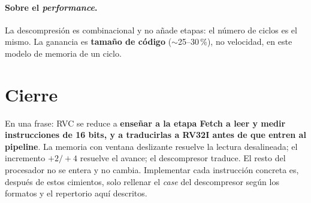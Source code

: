 \documentclass[11pt]{article}
\begin{document}
\paragraph{Sobre el \emph{performance}.} La descompresión es combinacional y no
añade etapas: el número de ciclos es el mismo. La ganancia es \textbf{tamaño de
código} ($\sim$25--30\,\%), no velocidad, en este modelo de memoria de un ciclo.

\section*{Cierre}

En una frase: RVC se reduce a \textbf{enseñar a la etapa Fetch a leer y medir
instrucciones de 16 bits, y a traducirlas a RV32I antes de que entren al
pipeline}. La memoria con ventana deslizante resuelve la lectura desalineada; el
incremento $+2/+4$ resuelve el avance; el descompresor traduce. El resto del
procesador no se entera y no cambia. Implementar cada instrucción concreta es,
después de estos cimientos, solo rellenar el \emph{case} del descompresor según los
formatos y el repertorio aquí descritos.
\end{document}
